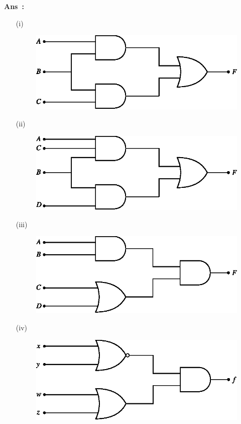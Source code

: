\begin{enumerate}
{\bf Ans~:}
\begin{itemize}
\item[(i)]~ 
\begin{figure}[H]
\centering
\includegraphics{chap5/ans5.1.eps}
\end{figure}

\item[(ii)]~ 
\begin{figure}[H]
\centering
\includegraphics{chap5/ans5.2.eps}
\end{figure}

\item[(iii)]~ 
\begin{figure}[H]
\centering
\includegraphics{chap5/ans5.3.eps}
\end{figure}

\item[(iv)]~ 
\begin{figure}[H]
\centering
\includegraphics{chap5/ans5.4.eps}
\end{figure}


\end{itemize}
\end{enumerate}
